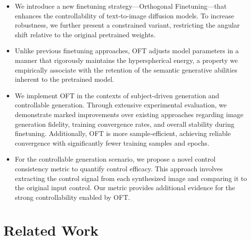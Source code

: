 \begin{itemize}[leftmargin=*,nosep]

    \item We introduce a new finetuning strategy—Orthogonal Finetuning—that enhances the controllability of text-to-image diffusion models. To increase robustness, we further present a constrained variant, restricting the angular shift relative to the original pretrained weights.
    \item Unlike previous finetuning approaches, OFT adjusts model parameters in a manner that rigorously maintains the hyperspherical energy, a property we empirically associate with the retention of the semantic generative abilities inherent to the pretrained model.
    \item We implement OFT in the contexts of subject-driven generation and controllable generation. Through extensive experimental evaluation, we demonstrate marked improvements over existing approaches regarding image generation fidelity, training convergence rates, and overall stability during finetuning. Additionally, OFT is more sample-efficient, achieving reliable convergence with significantly fewer training samples and epochs.
    \item For the controllable generation scenario, we propose a novel control consistency metric to quantify control efficacy. This approach involves extracting the control signal from each synthesized image and comparing it to the original input control. Our metric provides additional evidence for the strong controllability enabled by OFT.
\end{itemize}

\section{Related Work}

